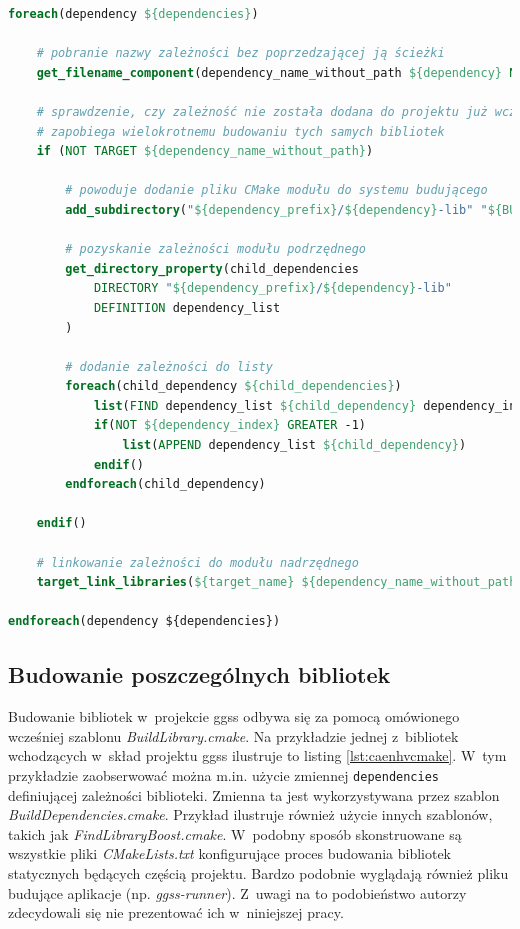 \begin{lstlisting}[language=cmake, caption={Plik \textit{BuildDependencies.cmake} będący częścią systemu budującego projekt \gls*{ggss}. Zawiera pętlę iterującą po zależnościach aktualnie budowanego modułu. Zależności te dodawane są do systemu budującego za pomocą polecenia \lstinline{add\_subdirectory}. Dołączone do listingu komentarze stanowią wytłumaczenie działania poszczególnych elementów pliku.}, label={lst:builddependenciescmake}]
foreach(dependency ${dependencies})
    
    # pobranie nazwy zależności bez poprzedzającej ją ścieżki
    get_filename_component(dependency_name_without_path ${dependency} NAME)

    # sprawdzenie, czy zależność nie została dodana do projektu już wcześniej - 
    # zapobiega wielokrotnemu budowaniu tych samych bibliotek
    if (NOT TARGET ${dependency_name_without_path})

        # powoduje dodanie pliku CMake modułu do systemu budującego
        add_subdirectory("${dependency_prefix}/${dependency}-lib" "${BUILD_OUTPUT_DIRECTORY}/${dependency_name_without_path}-lib/build")

        # pozyskanie zależności modułu podrzędnego 
        get_directory_property(child_dependencies 
            DIRECTORY "${dependency_prefix}/${dependency}-lib" 
            DEFINITION dependency_list
        )

        # dodanie zależności do listy 
        foreach(child_dependency ${child_dependencies})
            list(FIND dependency_list ${child_dependency} dependency_index)
            if(NOT ${dependency_index} GREATER -1)
                list(APPEND dependency_list ${child_dependency})
            endif()
        endforeach(child_dependency)
        
    endif()

    # linkowanie zależności do modułu nadrzędnego
    target_link_libraries(${target_name} ${dependency_name_without_path})

endforeach(dependency ${dependencies})
\end{lstlisting}


\subsection{Budowanie poszczególnych bibliotek}
Budowanie bibliotek w~projekcie \gls*{ggss} odbywa się za pomocą omówionego wcześniej szablonu \textit{BuildLibrary.cmake}. Na przykładzie jednej z~bibliotek wchodzących w~skład projektu \gls*{ggss} ilustruje to listing \ref{lst:caenhvcmake}. W~tym przykładzie zaobserwować można m.in. użycie zmiennej \lstinline{dependencies} definiującej zależności biblioteki. Zmienna ta jest wykorzystywana przez szablon \textit{BuildDependencies.cmake}. Przykład ilustruje również użycie innych szablonów, takich jak \textit{FindLibraryBoost.cmake}. W~podobny sposób skonstruowane są wszystkie pliki \textit{CMakeLists.txt} konfigurujące proces budowania bibliotek statycznych będących częścią projektu. Bardzo podobnie wyglądają również pliku budujące aplikacje (np. \textit{ggss-runner}). Z~uwagi na to podobieństwo autorzy zdecydowali się nie prezentować ich w~niniejszej pracy. 

